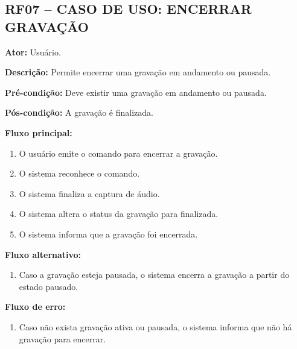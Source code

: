 \documentclass[12pt,oneside,a4paper,brazil,final]{abntex2}
\begin{document}
\clearpage
\subsection*{RF07 -- CASO DE USO: ENCERRAR GRAVAÇÃO}



\textbf{Ator:} Usuário.



\textbf{Descrição:} Permite encerrar uma gravação em andamento ou pausada.



\textbf{Pré-condição:} Deve existir uma gravação em andamento ou pausada.



\textbf{Pós-condição:} A gravação é finalizada.



\textbf{Fluxo principal:}

\begin{enumerate}

    \item O usuário emite o comando para encerrar a gravação.

    \item O sistema reconhece o comando.

    \item O sistema finaliza a captura de áudio.

    \item O sistema altera o status da gravação para finalizada.

    \item O sistema informa que a gravação foi encerrada.

\end{enumerate}



\textbf{Fluxo alternativo:}

\begin{enumerate}

    \item Caso a gravação esteja pausada, o sistema encerra a gravação a partir do estado pausado.

\end{enumerate}



\textbf{Fluxo de erro:}

\begin{enumerate}

    \item Caso não exista gravação ativa ou pausada, o sistema informa que não há gravação para encerrar.

\end{enumerate}
\end{document}
